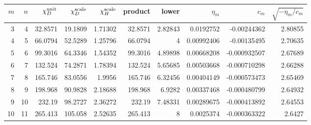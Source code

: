 \begin{tabular}{rrrrrrrrrr}
\toprule
$m$&$n$&$\chi_D^{\rm unit}$&$\chi_D^{\rm scale}$&$\chi_H^{\rm scale}$&product&lower&$\eta_m$&$c_m$&$\sqrt{-\eta_m/c_m}$\\
\midrule
3&4&32.8571&19.1809&1.71302&32.8571&2.82843&0.0192752&-0.00244362&2.80855\\
4&5&66.0794&52.5289&1.25796&66.0794&4&0.00992406&-0.00135495&2.70635\\
5&6&99.3016&64.3346&1.54352&99.3016&4.89898&0.00668208&-0.000932507&2.67689\\
6&7&132.524&74.2871&1.78394&132.524&5.65685&0.00503668&-0.000710298&2.66288\\
7&8&165.746&83.0556&1.9956&165.746&6.32456&0.00404149&-0.000573473&2.65469\\
8&9&198.968&90.9828&2.18688&198.968&6.9282&0.00337468&-0.000480799&2.64932\\
9&10&232.19&98.2727&2.36272&232.19&7.48331&0.00289675&-0.000413892&2.64553\\
10&11&265.413&105.058&2.52635&265.413&8&0.0025374&-0.000363322&2.6427\\
\bottomrule
\end{tabular}
